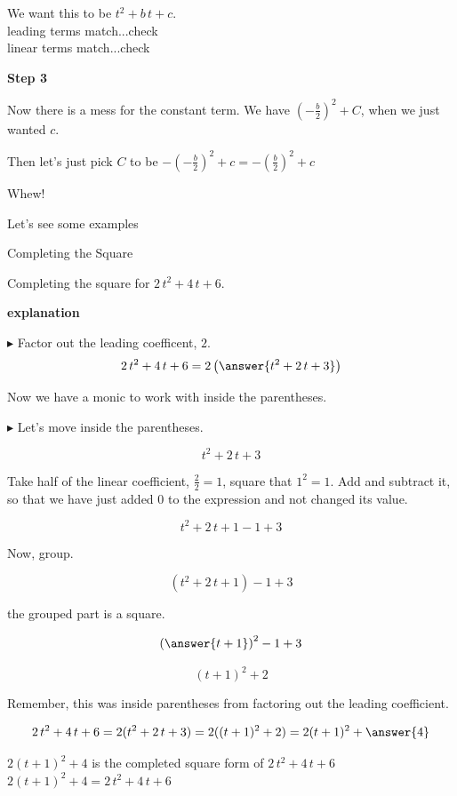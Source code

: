\documentclass{ximera}
\begin{document}
We want this to be $t^2 + b \, t + c$. \\

leading terms match...check \\
linear terms match...check 


\textbf{\textcolor{blue!75!black}{Step 3}} 


Now there is a mess for the constant term.  We have $\left( -\frac{b}{2}\right )^2 + C$, when we just wanted $c$.  

Then let's just pick $C$ to be $-\left( -\frac{b}{2}\right )^2 + c = -\left(\frac{b}{2}\right)^2 + c$



Whew!

Let's see some examples








\begin{example} Completing the Square



Completing the square for $2 \, t^2 + 4 \, t + 6$.


\textbf{\textcolor{red!75!green}{explanation}} 


$\blacktriangleright$ Factor out the leading coefficent, $2$.\\

\[     2 \, t^2 + 4 \, t + 6 = 2 \left( \answer{t^2 + 2 \, t + 3} \right)   \] 


Now we have a monic to work with inside the parentheses. 


$\blacktriangleright$ Let's move inside the parentheses.

\[ t^2 + 2 \, t + 3 \]

Take half of the linear coefficient, $\frac{2}{2} = 1$, square that $1^2 = 1$. Add and subtract it, so that we have just added $0$ to the expression and not changed its value.


\[ t^2 + 2 \, t + 1 - 1 +3 \]


Now, group.

\[ (t^2 + 2 \, t + 1) - 1 + 3 \]

the grouped part is a square.

\[ \left( \answer{t+1} \right)^2 - 1 + 3 \]

\[ (t+1)^2 + 2 \]

Remember, this was inside parentheses from factoring out the leading coefficient.

\[     2 \, t^2 + 4 \, t + 6 = 2 (t^2 + 2 \, t + 3)  = 2 ((t+1)^2 + 2) =  2 (t+1)^2 + \answer{4}\] 


$2 (t+1)^2 + 4$ is the completed square form of $2 \, t^2 + 4 \, t + 6$ \\


$2 (t+1)^2 + 4 = 2 \, t^2 + 4 \, t + 6$





\end{example}
\end{document}
